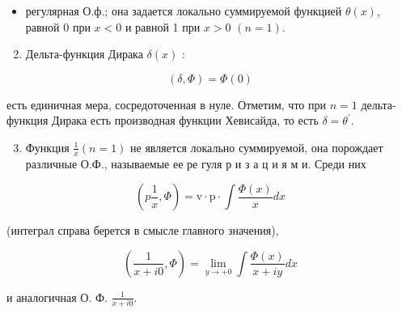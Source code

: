 \documentclass[10pt]{article}
\begin{document}
\begin{itemize}

  \item регулярная О.ф.; она задается локально суммируемой функцией $\theta(x)$, равной 0 при $x<0$ и равной 1 при $x>0$ $(n=1)$.

\end{itemize}



\begin{enumerate}

  \setcounter{enumi}{1}

  \item Дельта-функция Дирака $\delta(x)$ :

\end{enumerate}



\[

(\delta, \Phi)=\Phi(0)

\]



есть единичная мера, сосредоточенная в нуле. Отметим, что при $n=1$ дельта-функция Дирака есть производная функции Хевисайда, то есть $\delta=\theta^{\prime}$.



\begin{enumerate}

  \setcounter{enumi}{2}

  \item Функция $\frac{1}{x}(n=1)$ не является локально суммируемой, она порождает различные О.Ф., называемые ее ре гуля р и з а ц и я м и. Среди них

\end{enumerate}



\[

\left(p \frac{1}{x}, \Phi\right)=\mathrm{v} \cdot \mathrm{p} \cdot \int \frac{\Phi(x)}{x} d x

\]



(интеграл справа берется в смысле главного значения),



\[

\left(\frac{1}{x+i 0}, \Phi\right)=\lim _{y \rightarrow+0} \int \frac{\Phi(x)}{x+i y} d x

\]



и аналогичная О. Ф. $\frac{1}{x+i 0}$.
\end{document}

